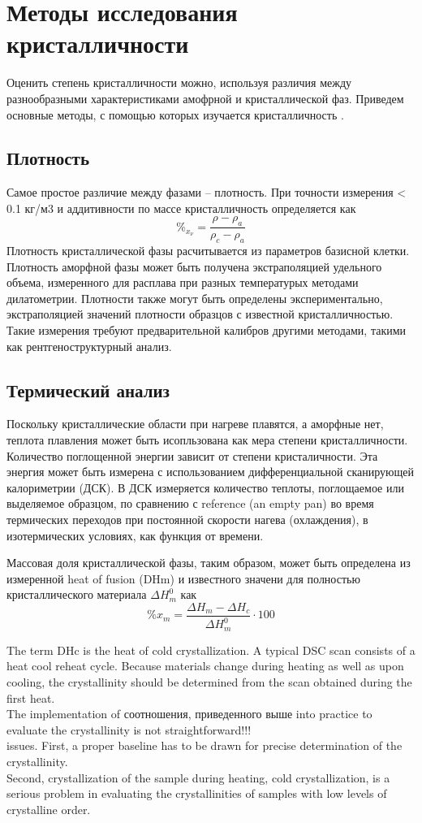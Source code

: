 \section{Методы исследования кристалличности}

Оценить степень кристалличности можно, используя различия между разнообразными характеристиками амофрной и кристаллической фаз.
Приведем основные методы, с помощью которых изучается кристалличность \cite{cryst3}.

\subsection{Плотность}

Самое простое различие между фазами -- плотность. При точности измерения < 0.1 кг/м3 и аддитивности по массе кристалличность определяется как
\[
\%_{x_{\nu}} =\frac{\rho - \rho_a}{\rho_c-\rho_a}
\]
Плотность кристаллической фазы расчитывается из параметров базисной клетки. Плотность аморфной фазы может быть получена экстраполяцией удельного объема, измеренного для расплава при разных температурых методами дилатометрии. Плотности также могут быть определены экспериментально, экстраполяцией значений плотности образцов с известной кристалличностью. Такие измерения требуют предварительной калибров другими методами, такими как рентгеноструктурный анализ.

\subsection{Термический анализ}
Поскольку кристаллические области при нагреве плавятся, а аморфные нет, теплота плавления может быть исопльзована как мера степени кристалличности.
Количество поглощенной энергии зависит от степени кристаличности. Эта энергия может быть измерена с использованием дифференциальной сканирующей калориметрии (ДСК). В ДСК измеряется количество теплоты, поглощаемое или выделяемое образцом, по сравнению с reference (an empty pan) во время термических переходов при постоянной скорости нагева (охлаждения), в изотермических условиях, как функция от времени.

Массовая доля кристаллической фазы, таким образом, может быть определена из измеренной  heat of fusion (DHm) и известного значени для полностью кристаллического материала $\Delta H^0_m$ как
\[
\%x_m = \frac{\Delta H_m - \Delta H_c }{\Delta H^0_m}\cdot100
\]

The term DHc is the heat of cold crystallization. A typical DSC scan consists of a heat cool reheat cycle. Because materials
change during heating as well as upon cooling, the crystallinity should be determined
from the scan obtained during the first heat.\\
The implementation of соотношения, приведенного выше
into practice to evaluate the crystallinity is not straightforward!!!\\
issues. First, a proper baseline has to be drawn for precise determination of the crystallinity. \\
Second, crystallization of the sample during heating, cold crystallization,
is a serious problem in evaluating the crystallinities of samples with low
levels of crystalline order.\\

